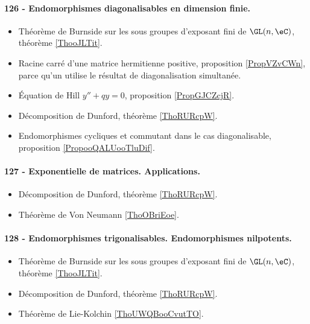 \paragraph{126 - Endomorphismes diagonalisables en dimension finie.}
\begin{itemize}
    \item Théorème de Burnside sur les sous groupes d'exposant fini de \( \GL(n,\eC)\), théorème \ref{ThooJLTit}.
    \item Racine carré d'une matrice hermitienne positive, proposition \ref{PropVZvCWn}, parce qu'un utilise le résultat de diagonalisation simultanée.
    \item Équation de Hill \( y''+qy=0\), proposition \ref{PropGJCZcjR}.
    \item Décomposition de Dunford, théorème \ref{ThoRURcpW}. 
    \item Endomorphismes cycliques et commutant dans le cas diagonalisable, proposition \ref{PropooQALUooTluDif}.
\end{itemize}
\paragraph{127 - Exponentielle de matrices. Applications.}
\begin{itemize}
    \item Décomposition de Dunford, théorème \ref{ThoRURcpW}.
    \item Théorème de Von Neumann \ref{ThoOBriEoe}.
\end{itemize}
\paragraph{128 - Endomorphismes trigonalisables. Endomorphismes nilpotents.}
\begin{itemize}
    \item Théorème de Burnside sur les sous groupes d'exposant fini de \( \GL(n,\eC)\), théorème \ref{ThooJLTit}.
    \item Décomposition de Dunford, théorème \ref{ThoRURcpW}. 
    \item Théorème de Lie-Kolchin \ref{ThoUWQBooCvutTO}.
\end{itemize}
